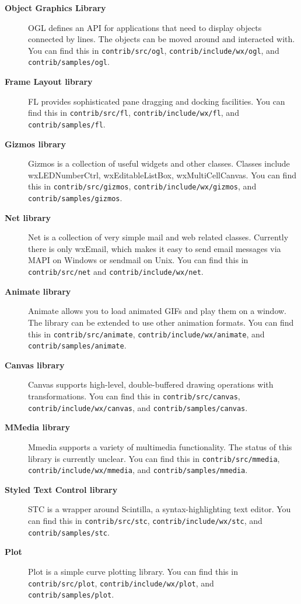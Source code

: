 \begin{description}
\item[{\bf Object Graphics Library}]
OGL defines an API for applications that need to display objects connected by lines.
The objects can be moved around and interacted with.
You can find this in {\tt contrib/src/ogl}, {\tt contrib/include/wx/ogl}, and {\tt contrib/samples/ogl}.

\item[{\bf Frame Layout library}]
FL provides sophisticated pane dragging and docking facilities.
You can find this in {\tt contrib/src/fl}, {\tt contrib/include/wx/fl}, and {\tt contrib/samples/fl}.

\item[{\bf Gizmos library}]
Gizmos is a collection of useful widgets and other classes. Classes include wxLEDNumberCtrl,
wxEditableListBox, wxMultiCellCanvas.
You can find this in {\tt contrib/src/gizmos}, {\tt contrib/include/wx/gizmos}, and {\tt contrib/samples/gizmos}.

\item[{\bf Net library}]
Net is a collection of very simple mail and web related classes. Currently
there is only wxEmail, which makes it easy to send email messages via MAPI on Windows or sendmail on Unix.
You can find this in {\tt contrib/src/net} and {\tt contrib/include/wx/net}.

\item[{\bf Animate library}]
Animate allows you to load animated GIFs and play them on a window. The library can be extended
to use other animation formats.
You can find this in {\tt contrib/src/animate}, {\tt contrib/include/wx/animate}, and {\tt contrib/samples/animate}.

\item[{\bf Canvas library}]
Canvas supports high-level, double-buffered drawing operations with transformations.
You can find this in {\tt contrib/src/canvas}, {\tt contrib/include/wx/canvas}, and {\tt contrib/samples/canvas}.

\item[{\bf MMedia library}]
Mmedia supports a variety of multimedia functionality. The status of this library is currently unclear.
You can find this in {\tt contrib/src/mmedia}, {\tt contrib/include/wx/mmedia}, and {\tt contrib/samples/mmedia}.

\item[{\bf Styled Text Control library}]
STC is a wrapper around Scintilla, a syntax-highlighting text editor.
You can find this in {\tt contrib/src/stc}, {\tt contrib/include/wx/stc}, and {\tt contrib/samples/stc}.

\item[{\bf Plot}]
Plot is a simple curve plotting library.
You can find this in {\tt contrib/src/plot}, {\tt contrib/include/wx/plot}, and {\tt contrib/samples/plot}.
\end{description}

